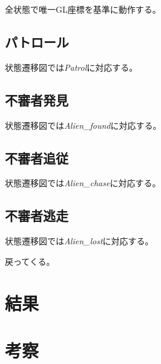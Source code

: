 \documentclass[main]{subfiles}
\begin{document}
全状態で唯一GL座標を基準に動作する。
\subsection{パトロール}
状態遷移図では\textit{Patrol}に対応する。

\subsection{不審者発見}
状態遷移図では\textit{Alien\_found}に対応する。

\subsection{不審者追従}
状態遷移図では\textit{Alien\_chase}に対応する。

\subsection{不審者逃走}
状態遷移図では\textit{Alien\_lost}に対応する。

戻ってくる。

\section{結果}
\section{考察}
\end{document}
